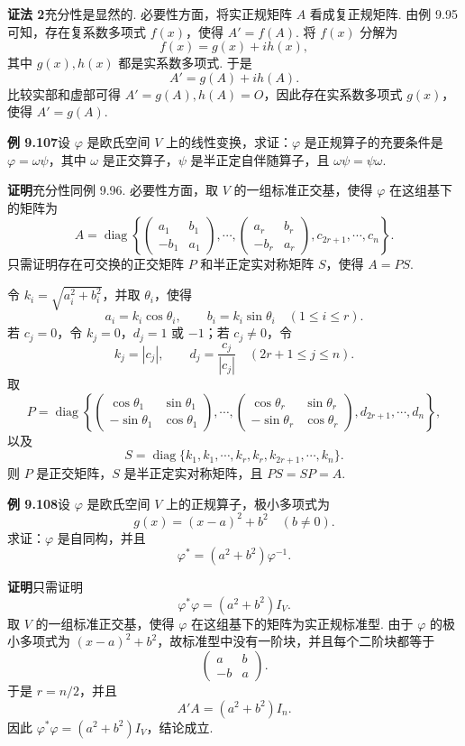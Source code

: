 \documentclass[UTF8,12pt,a4paper,fontset=fandol]{ctexart}
\begin{document}
\noindent\textbf{证法 2}\quad 充分性是显然的. 必要性方面，将实正规矩阵 $A$ 看成复正规矩阵. 由例 9.95 可知，存在复系数多项式 $f(x)$，使得 $A'=f(A)$. 将 $f(x)$ 分解为
\[
f(x)=g(x)+ih(x),
\]
其中 $g(x),h(x)$ 都是实系数多项式. 于是
\[
A'=g(A)+ih(A).
\]
比较实部和虚部可得 $A'=g(A),h(A)=O$，因此存在实系数多项式 $g(x)$，使得 $A'=g(A)$.

\noindent\textbf{例 9.107}\quad 设 $\varphi$ 是欧氏空间 $V$ 上的线性变换，求证：$\varphi$ 是正规算子的充要条件是 $\varphi=\omega\psi$，其中 $\omega$ 是正交算子，$\psi$ 是半正定自伴随算子，且 $\omega\psi=\psi\omega$.

\noindent\textbf{证明}\quad 充分性同例 9.96. 必要性方面，取 $V$ 的一组标准正交基，使得 $\varphi$ 在这组基下的矩阵为
\[
A=\operatorname{diag}\left\{
\begin{pmatrix}
a_1&b_1\\
-b_1&a_1
\end{pmatrix},\cdots,
\begin{pmatrix}
a_r&b_r\\
-b_r&a_r
\end{pmatrix},
c_{2r+1},\cdots,c_n
\right\}.
\]
只需证明存在可交换的正交矩阵 $P$ 和半正定实对称矩阵 $S$，使得 $A=PS$.

令 $k_i=\sqrt{a_i^2+b_i^2}$，并取 $\theta_i$，使得
\[
a_i=k_i\cos\theta_i,\qquad b_i=k_i\sin\theta_i\quad (1\le i\le r).
\]
若 $c_j=0$，令 $k_j=0$，$d_j=1$ 或 $-1$；若 $c_j\ne0$，令
\[
k_j=|c_j|,\qquad d_j=\frac{c_j}{|c_j|}\quad (2r+1\le j\le n).
\]
取
\[
P=\operatorname{diag}\left\{
\begin{pmatrix}
\cos\theta_1&\sin\theta_1\\
-\sin\theta_1&\cos\theta_1
\end{pmatrix},\cdots,
\begin{pmatrix}
\cos\theta_r&\sin\theta_r\\
-\sin\theta_r&\cos\theta_r
\end{pmatrix},
d_{2r+1},\cdots,d_n
\right\},
\]
以及
\[
S=\operatorname{diag}\{k_1,k_1,\cdots,k_r,k_r,k_{2r+1},\cdots,k_n\}.
\]
则 $P$ 是正交矩阵，$S$ 是半正定实对称矩阵，且 $PS=SP=A$.

\noindent\textbf{例 9.108}\quad 设 $\varphi$ 是欧氏空间 $V$ 上的正规算子，极小多项式为
\[
g(x)=(x-a)^2+b^2\quad (b\ne0).
\]
求证：$\varphi$ 是自同构，并且
\[
\varphi^*=(a^2+b^2)\varphi^{-1}.
\]

\noindent\textbf{证明}\quad 只需证明
\[
\varphi^*\varphi=(a^2+b^2)I_V.
\]
取 $V$ 的一组标准正交基，使得 $\varphi$ 在这组基下的矩阵为实正规标准型. 由于 $\varphi$ 的极小多项式为 $(x-a)^2+b^2$，故标准型中没有一阶块，并且每个二阶块都等于
\[
\begin{pmatrix}
a&b\\
-b&a
\end{pmatrix}.
\]
于是 $r=n/2$，并且
\[
A'A=(a^2+b^2)I_n.
\]
因此 $\varphi^*\varphi=(a^2+b^2)I_V$，结论成立.
\end{document}
